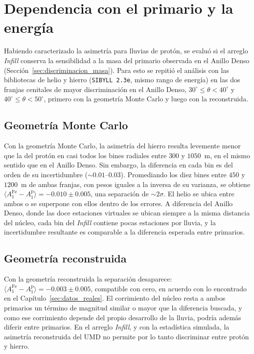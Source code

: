 \section{Dependencia con el primario y la energía}
\label{sec:infill_masa}

Habiendo caracterizado la asimetría para lluvias de protón, se evaluó si el arreglo \textit{Infill} conserva la sensibilidad a la masa del primario observada en el Anillo Denso (Sección~\ref{sec:discriminacion_masa}). Para esto se repitió el análisis con las bibliotecas de helio y hierro (\texttt{SIBYLL 2.3e}, mismo rango de energía) en las dos franjas cenitales de mayor discriminación en el Anillo Denso, $30^\circ \leq \theta < 40^\circ$ y $40^\circ \leq \theta < 50^\circ$, primero con la geometría Monte Carlo y luego con la reconstruida.

\subsection{Geometría Monte Carlo}

Con la geometría Monte Carlo, la asimetría del hierro resulta levemente menor que la del protón en casi todos los bines radiales entre $300$ y $1050$~m, en el mismo sentido que en el Anillo Denso. Sin embargo, la diferencia en cada bin es del orden de su incertidumbre ($\sim 0.01$--$0.03$). Promediando los diez bines entre $450$ y $1200$~m de ambas franjas, con pesos iguales a la inversa de su varianza, se obtiene $\langle A_1^{\mathrm{Fe}} - A_1^{\mathrm{p}} \rangle = -0.010 \pm 0.005$, una separación de $\sim 2\sigma$. El helio se ubica entre ambos o se superpone con ellos dentro de los errores. A diferencia del Anillo Denso, donde las doce estaciones virtuales se ubican siempre a la misma distancia del núcleo, cada bin del \textit{Infill} contiene pocas estaciones por lluvia, y la incertidumbre resultante es comparable a la diferencia esperada entre primarios.

\subsection{Geometría reconstruida}

Con la geometría reconstruida la separación desaparece: $\langle A_1^{\mathrm{Fe}} - A_1^{\mathrm{p}} \rangle = -0.003 \pm 0.005$, compatible con cero, en acuerdo con lo encontrado en el Capítulo~\ref{sec:datos_reales}. El corrimiento del núcleo resta a ambos primarios un término de magnitud similar o mayor que la diferencia buscada, y como ese corrimiento depende del propio desarrollo de la lluvia, podría además diferir entre primarios. En el arreglo \textit{Infill}, y con la estadística simulada, la asimetría reconstruida del UMD no permite por lo tanto discriminar entre protón y hierro.


